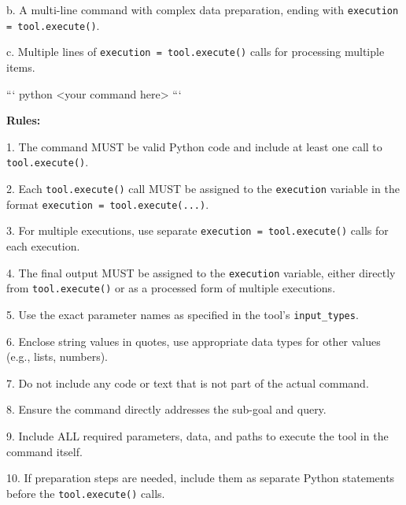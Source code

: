 \begin{textcolorbox}
\quad b. A multi-line command with complex data preparation, ending with \texttt{execution = tool.execute()}.

\quad  c. Multiple lines of \texttt{execution = tool.execute()} calls for processing multiple items.
\begin{codebox}
```
python
<your command here>
```
\end{codebox}
\textbf{Rules:}

1. The command MUST be valid Python code and include at least one call to \texttt{tool.execute()}.

2. Each \texttt{tool.execute()} call MUST be assigned to the \texttt{execution} variable in the format \texttt{execution = tool.execute(...)}.

3. For multiple executions, use separate \texttt{execution = tool.execute()} calls for each execution.

4. The final output MUST be assigned to the \texttt{execution} variable, either directly from \texttt{tool.execute()} or as a processed form of multiple executions.

5. Use the exact parameter names as specified in the tool's \texttt{input\_types}.

6. Enclose string values in quotes, use appropriate data types for other values (e.g., lists, numbers).

7. Do not include any code or text that is not part of the actual command.

8. Ensure the command directly addresses the sub-goal and query.

9. Include ALL required parameters, data, and paths to execute the tool in the command itself.

10. If preparation steps are needed, include them as separate Python statements before the \texttt{tool.execute()} calls.
\end{textcolorbox}


